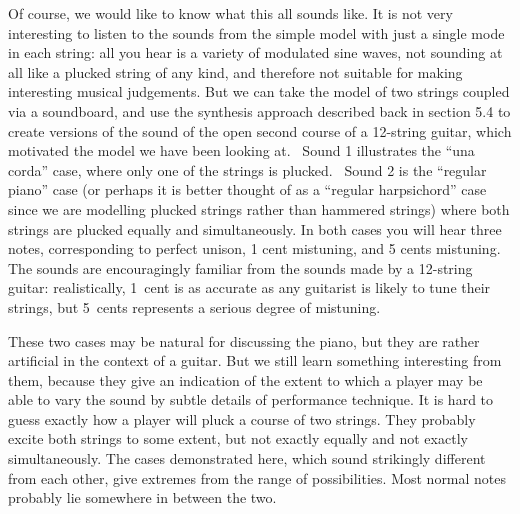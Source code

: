  Of course, we would like to know what this all sounds like. It is not very 
  interesting to listen to the sounds from the simple model with just a single 
  mode in each string: all you hear is a variety of modulated sine waves, not 
  sounding at all like a plucked string of any kind, and therefore not suitable 
  for making interesting musical judgements. But we can take the model of two 
  strings coupled via a soundboard, and use the synthesis approach described 
  back in section 5.4 to create versions of the sound of the open second course 
  of a 12-string guitar, which motivated the model we have been looking at.~ 
  Sound 1 illustrates the “una corda” case, where only one of the strings is 
  plucked.~ Sound 2 is the “regular piano” case (or perhaps it is better 
  thought of as a ``regular harpsichord'' case since we are modelling plucked 
  strings rather than hammered strings) where both strings are plucked equally 
  and simultaneously. In both cases you will hear three notes, corresponding to 
  perfect unison, 1 cent mistuning, and 5 cents mistuning. The sounds are 
  encouragingly familiar from the sounds made by a 12-string guitar: 
  realistically, 1~cent is as accurate as any guitarist is likely to tune their 
  strings, but 5~cents represents a serious degree of mistuning. 



  These two cases may be natural for discussing the piano, but they are rather 
  artificial in the context of a guitar. But we still learn something 
  interesting from them, because they give an indication of the extent to which 
  a player may be able to vary the sound by subtle details of performance 
  technique. It is hard to guess exactly how a player will pluck a course of 
  two strings. They probably excite both strings to some extent, but not 
  exactly equally and not exactly simultaneously. The cases demonstrated here, 
  which sound strikingly different from each other, give extremes from the 
  range of possibilities. Most normal notes probably lie somewhere in between 
  the two. 

